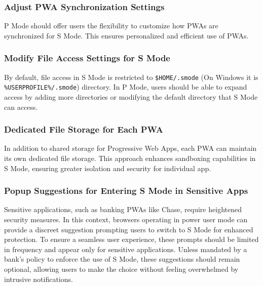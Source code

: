 \subsubsection{Adjust PWA Synchronization Settings}

P Mode should offer users the flexibility to customize how PWAs are synchronized for S Mode. This ensures personalized and efficient use of PWAs.

\subsubsection{Modify File Access Settings for S Mode}

By default, file access in S Mode is restricted to \texttt{\$HOME/.smode} (On Windows it is \texttt{\%USERPROFILE\%/.smode}) directory. In P Mode, users should be able to expand access by adding more directories or modifying the default directory that S Mode can access.

\subsubsection{Dedicated File Storage for Each PWA}

In addition to shared storage for Progressive Web Apps, each PWA can maintain its own dedicated file storage. This approach enhances sandboxing capabilities in S Mode, ensuring greater isolation and security for individual app.

\subsubsection{Popup Suggestions for Entering S Mode in Sensitive Apps}

Sensitive applications, such as banking PWAs like Chase, require heightened security measures. In this context, browsers operating in power user mode can provide a discreet suggestion prompting users to switch to S Mode for enhanced protection. To ensure a seamless user experience, these prompts should be limited in frequency and appear only for sensitive applications. Unless mandated by a bank's policy to enforce the use of S Mode, these suggestions should remain optional, allowing users to make the choice without feeling overwhelmed by intrusive notifications.
